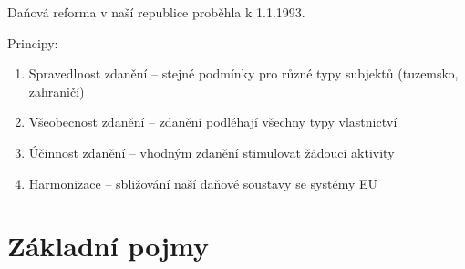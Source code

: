 Daňová reforma v naší republice proběhla k 1.1.1993.

Principy:
\begin{enumerate}
    \item Spravedlnost zdanění -- stejné podmínky pro různé typy subjektů (tuzemsko, zahraničí)
    \item Všeobecnost zdanění -- zdanění podléhají všechny typy vlastnictví
    \item Účinnost zdanění -- vhodným zdanění stimulovat žádoucí aktivity
    \item Harmonizace -- sbližování naší daňové soustavy se systémy EU
\end{enumerate}

\section*{Základní pojmy}
